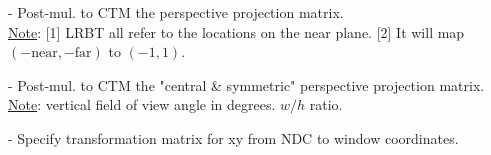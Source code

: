 \documentclass[10pt,landscape,letterpaper]{article}
\begin{document}
\begin{multicols}{3}
 - Post-mul. to CTM the perspective projection matrix.
\\
\underline{Note}: [1] LRBT all refer to the locations on the near plane. [2] It will map $(-\text{near}, -\text{far})$ to $(-1, 1)$.

 - Post-mul. to CTM the "central \& symmetric" perspective projection matrix.
\\
\underline{Note}:  vertical field of view angle in degrees.  $w / h$ ratio.

 - Specify transformation matrix for xy from NDC to window coordinates. 




\end{multicols}
\end{document}
